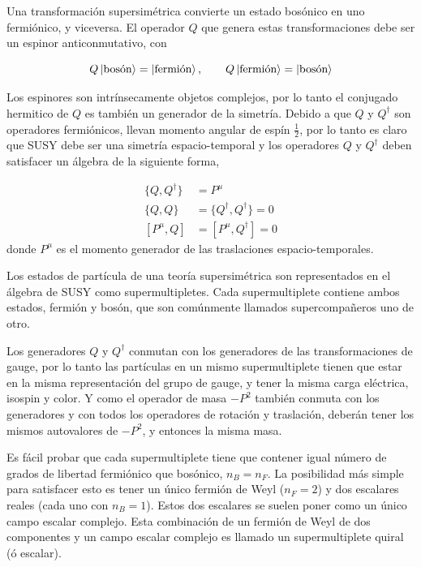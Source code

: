 Una transformación supersimétrica convierte un estado bosónico en uno
fermiónico, y viceversa. El operador $Q$ que genera estas transformaciones debe
ser un espinor anticonmutativo, con

\begin{equation}
  Q \left| \text{bosón} \right> = \left| \text{fermión} \right>, \quad \quad Q
  \left| \text{fermión} \right> = \left| \text{bosón} \right>
\end{equation}

Los espinores son intrínsecamente objetos complejos, por lo tanto el conjugado
hermitico de $Q$ es también un generador de la simetría. Debido a que $Q$ y
$Q^\dagger$ son operadores fermiónicos, llevan momento angular de espín $\frac{1}{2}$, por
lo tanto es claro que SUSY debe ser una simetría espacio-temporal y los
operadores $Q$ y $Q^\dagger$ deben satisfacer un álgebra de la siguiente forma,

\begin{align}
  \{Q, Q^\dagger\} &= P^\mu \\
  \{Q, Q\} &= \{Q^\dagger, Q^\dagger\} = 0 \\
  [P^\mu, Q] &= [P^\mu, Q^\dagger] = 0
\end{align}
%
donde $P^\mu$ es el momento generador de las traslaciones
espacio-temporales.

Los estados de partícula de una teoría supersimétrica son representados en el
álgebra de SUSY como supermultipletes. Cada supermultiplete contiene
ambos estados, fermión y bosón, que son comúnmente llamados supercompa\~neros
uno de otro.

Los generadores $Q$ y $Q^\dagger$ conmutan con los generadores de las
transformaciones de gauge, por lo tanto las partículas en un mismo
supermultiplete tienen que estar en la misma representación del grupo de gauge,
y tener la misma carga eléctrica, isospin y color. Y como el operador de masa
$-P^2$ también conmuta con los generadores y con todos los operadores de
rotación y traslación, deberán tener los mismos autovalores de $-P^2$, y
entonces la misma masa.

Es fácil probar que cada supermultiplete tiene que contener igual número de
grados de libertad fermiónico que bosónico, $n_B = n_F$. La posibilidad más
simple para satisfacer esto es tener un único fermión de Weyl ($n_F=2$) y dos
escalares reales (cada uno con $n_B=1$). Estos dos escalares se suelen poner
como un único campo escalar complejo. Esta combinación de un fermión de Weyl de
dos componentes y un campo escalar complejo es llamado un supermultiplete
quiral (ó escalar).

